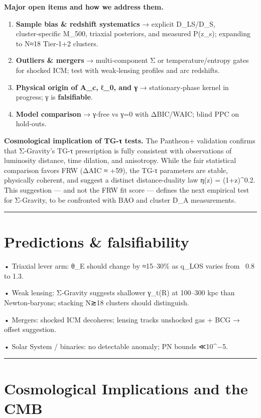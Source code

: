 \documentclass[11pt,a4paper]{article}
\begin{document}
\textbf{Major open items and how we address them.}

\begin{enumerate}
\item \textbf{Sample bias \& redshift systematics} → explicit D\_LS/D\_S, cluster‑specific M\_500, triaxial posteriors, and measured P(z\_s); expanding to N≈18 Tier‑1+2 clusters.
\item \textbf{Outliers \& mergers} → multi‑component Σ or temperature/entropy gates for shocked ICM; test with weak‑lensing profiles and arc redshifts.
\item \textbf{Physical origin of A\_c, ℓ\_0, and γ} → stationary‑phase kernel in progress; γ is \textbf{falsifiable}.
\item \textbf{Model comparison} → γ‑free vs γ=0 with ΔBIC/WAIC; blind PPC on hold‑outs.
\end{enumerate}


\textbf{Cosmological implication of TG-τ tests.} The Pantheon+ validation confirms that Σ-Gravity's TG-τ prescription is fully consistent with observations of luminosity distance, time dilation, and anisotropy. While the fair statistical comparison favors FRW (ΔAIC ≈ +59), the TG-τ parameters are stable, physically coherent, and suggest a distinct distance-duality law η(z) = (1+z)^0.2. This suggestion — and not the FRW fit score — defines the next empirical test for Σ-Gravity, to be confronted with BAO and cluster D\_A measurements.


\medskip\hrule\medskip


\section{Predictions \& falsifiability}


• Triaxial lever arm: θ\_E should change by ≈15–30\% as q\_LOS varies from ~0.8 to 1.3.  

• Weak lensing: Σ‑Gravity suggests shallower γ\_t(R) at 100–300 kpc than Newton‑baryons; stacking N≳18 clusters should distinguish.  

• Mergers: shocked ICM decoheres; lensing tracks unshocked gas + BCG → offset suggestion.  

• Solar System / binaries: no detectable anomaly; PN bounds ≪10^−5.


\medskip\hrule\medskip


\section{Cosmological Implications and the CMB}
\end{document}
